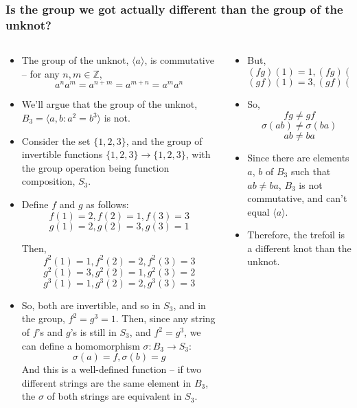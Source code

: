 \documentclass[8pt]{beamer}
\begin{document}
  \begin{frame}
    \frametitle{Is the group we got actually different than the group of the unknot?}
    \begin{columns}
      \begin{column}[T]{0.5\textwidth}
        \begin{itemize}
          \item<1-> The group of the unknot, $\langle a\rangle $, is commutative -- for any $n, m \in \mathbb{Z}$,
            \[a^na^m = a^{n+m} = a^{m+n} = a^ma^n\]
          \item<2-> We'll argue that the group of the unknot, $B_3 = \langle a,b : a^2 = b^3\rangle $ is not.

          \item<3-> Consider the set $\{1,2,3\}$, and the group of invertible
            functions $\{1,2,3\} \rightarrow \{1,2,3\}$, with the group operation
            being function composition, $S_3$.
          \item<4-> Define $f$ and $g$ as follows:
            \[f(1) = 2, f(2) = 1, f(3) = 3\]
            \[g(1) = 2, g(2) = 3, g(3) = 1\]

            Then,
            \[f^2(1) = 1, f^2(2) = 2, f^2(3) = 3\]
            \[g^2(1) = 3, g^2(2) = 1, g^2(3) = 2\]
            \[g^3(1) = 1, g^3(2) = 2, g^3(3) = 3\]

          \item<5-> So, both are invertible, and so in $S_3$, and in the group,
            $f^2 = g^3 = 1$. Then, since any string of $f$'s and $g$'s is still
            in $S_3$, and $f^2 = g^3$, we can define a homomorphism $\sigma : B_3 \rightarrow S_3$:
            \[\sigma(a) = f, \sigma(b) = g\]
            And this is a well-defined function -- if two different strings are
            the same element in $B_3$, the $\sigma$ of both strings are
            equivalent in $S_3$.
        \end{itemize}
      \end{column}
      \begin{column}[T]{0.5\textwidth}
        \begin{itemize}
          \item<6->
            But,
            \[(fg)(1) = 1, (fg)(2) = 3, (fg)(3) = 2\]
            \[(gf)(1) = 3, (gf)(2) = 3, (gf)(3) = 1\]
          \item<7->  So,
            \[fg \neq gf\]
            \[\sigma(ab) \neq \sigma (ba)\]
            \[ab \neq ba\]
          \item<8->  Since there are elements $a$, $b$ of $B_3$ such that $ab \neq ba$,
            $B_3$ is not commutative, and can't equal $\langle a\rangle $.
          \item<9-> Therefore, the trefoil is a different knot than the unknot.
        \end{itemize}
      \end{column}
    \end{columns}
  \end{frame}
\end{document}
